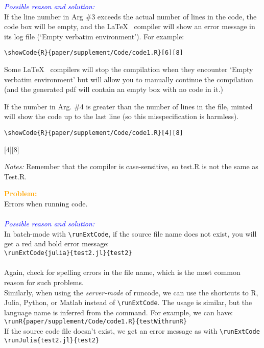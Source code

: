 \documentclass[a4paper,10pt]{article}
\newcommand{\prob}[1] {\bigskip\noindent\textbf{\textcolor{orange}{Problem:}}\\#1\\\\}
\newcommand{\cause}[1] {\noindent\textit{\textcolor{blue}{Possible reason and solution:}}\\#1}
\newcommand{\cmnt}[1] {\bigskip\noindent\textit{Notes:} #1}
\begin{document}
\cause\bgroup
If the line number in Arg \#3 exceeds the actual number of lines in the code, the code box will be empty, and the \LaTeX~ compiler will show an error message in its log file (`Empty verbatim environment'). For example:
\begin{verbatim}\showCode{R}{paper/supplement/Code/code1.R}[6][8]
\end{verbatim}
\noindent Some \LaTeX~ compilers will stop the compilation when they encounter `Empty verbatim environment' but will allow you to manually continue the compilation (and the generated pdf will contain an empty box with no code in it.)

\noindent If the number in Arg. \#4 is greater than the number of lines in the file, minted will show the code up to the last line (so this misspecification is harmless).
\begin{verbatim}\showCode{R}{paper/supplement/Code/code1.R}[4][8]
\end{verbatim}
[4][8]
\egroup

\cmnt{Remember that the compiler is case-sensitive, so test.R is not the same as Test.R.}




\prob{Errors when running code.}
\cause\bgroup
In batch-mode with \verb|\runExtCode|, if the source file name does not exist, you will get a red and bold error message:\\
\verb|\runExtCode{julia}{test2.jl}{test2}|\\
\\
Again, check for spelling errors in the file name, which is the most common reason for such problems.\\

\noindent Similarly, when using the \textit{server-mode} of runcode, we can use the shortcuts to R, Julia, Python, or Matlab instead of \verb|\runExtCode|. The usage is similar, but the language name is inferred from the command. For example, we can have:\\
\verb|\runR{paper/supplement/Code/code1.R}{testWithrunR}|
\\
If the source code file doesn't exist, we get an error message as with \verb|\runExtCode|\\
\verb|\runJulia{test2.jl}{test2}|\\
\\
\egroup
\end{document}
